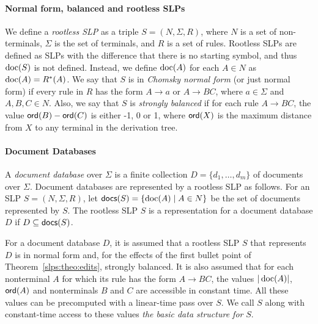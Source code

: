 \paragraph{Normal form, balanced and rootless SLPs}
 We define a {\it rootless SLP} as a triple $S = (N, \Sigma, R)$, where $N$ is a set of non-terminals, $\Sigma$ is the set of terminals, and $R$ is a set of rules. Rootless SLPs are defined as SLPs with the difference that there is no starting symbol, and thus $\operatorname{doc}(S)$ is not defined. Instead, we define $\operatorname{doc}(A)$ for each $A\in N$ as $\operatorname{doc}(A) = R^*(A)$. We say that $S$ is in {\it Chomsky normal form} (or just normal form) if every rule in $R$ has the form $A\to a$ or $A\to BC$, where $a\in \Sigma$ and $A, B, C\in N$. Also, we say that $S$ is {\it strongly balanced} if for each rule $A\to BC$, the value $\textsf{ord}(B) - \textsf{ord}(C)$ is either -1, 0 or 1, where $\textsf{ord}(X)$ is the maximum distance from $X$ to any terminal in the derivation tree. 

\paragraph{Document Databases} 
A {\it document database} over $\Sigma$ is a finite collection $D = \{d_1, \ldots, d_m\}$ of documents over $\Sigma$. Document databases are represented by a rootless SLP as follows. For an SLP $S = (N, \Sigma, R)$, let $\textsf{docs}(S) = \{\operatorname{doc}(A)\mid A\in N\}$ be the set of documents represented by $S$. The rootless SLP $S$ is a representation for a document database $D$ if $D\subseteq \textsf{docs}(S)$.

For a document database $D$, it is assumed that a rootless SLP $S$ that represents $D$ is in normal form and, for the effects of the first bullet point of Theorem~\ref{slps:theo:edits}, strongly balanced. It is also assumed that for each nonterminal $A$ for which its rule has the form $A\to BC$, the values $|\operatorname{doc}(A)|$, $\textsf{ord}(A)$ and nonterminals $B$ and $C$ are accessible in constant time. 
All these values can be  precomputed with a linear-time pass over $S$. We call $S$ along with constant-time access to these values {\it the basic data structure for} $S$.

